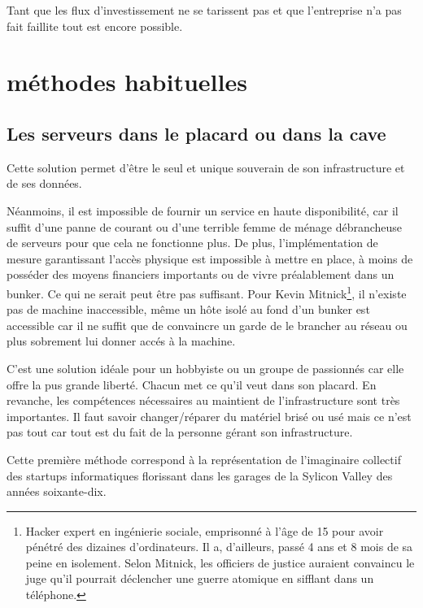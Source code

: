 \documentclass[11pt, a4paper ]{article}
\let\stdsection\section
\renewcommand\section{\newpage\stdsection}
\begin{document}
\begin{spacing}{1.5}
Tant que les flux d'investissement ne se tarissent pas et que l'entreprise n'a pas fait faillite tout est encore possible.




		\section{méthodes habituelles} %

			\subsection{Les serveurs dans le placard ou dans la cave}

Cette solution permet d'être le seul et unique souverain de son infrastructure et de ses données.

Néanmoins, il est impossible de fournir un service en haute disponibilité, car il suffit d'une panne de courant ou d'une terrible femme de ménage débrancheuse de serveurs pour que cela ne fonctionne plus.
De plus, l'implémentation de mesure garantissant l'accès physique est impossible à mettre en place, à moins de posséder des moyens financiers importants ou de vivre préalablement dans un bunker. Ce qui ne serait peut être pas suffisant. Pour Kevin Mitnick\footnote{Hacker expert en ingénierie sociale, emprisonné à l'âge de 15 pour avoir pénétré des dizaines d'ordinateurs. Il a, d'ailleurs, passé 4 ans et 8 mois de sa peine en isolement. Selon Mitnick, les officiers de justice auraient convaincu le juge qu'il pourrait déclencher une guerre atomique en sifflant dans un téléphone.}, il n'existe pas de machine inaccessible, même un hôte isolé au fond d'un bunker est accessible car il ne suffit que de convaincre un garde de le brancher au réseau ou plus sobrement lui donner accés à la machine.

C'est une solution idéale pour un hobbyiste ou un groupe de passionnés car elle offre la pus grande liberté. Chacun met ce qu'il veut dans son placard. En revanche, les compétences nécessaires au maintient de l'infrastructure sont très importantes. Il faut savoir changer/réparer du matériel brisé ou usé mais ce n'est pas tout car tout est du fait de la personne gérant son infrastructure.

Cette première méthode correspond à la représentation de l’imaginaire collectif des startups informatiques florissant dans les garages de la Sylicon Valley des années soixante-dix.


\end{spacing}
\end{document}
